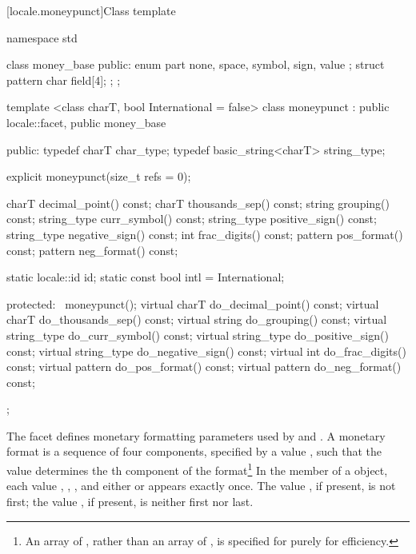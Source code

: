 [locale.moneypunct]{Class template }

%
\begin{codeblock}
namespace std {
  class money_base {
  public:
    enum part { none, space, symbol, sign, value };
    struct pattern { char field[4]; };
  };

  template <class charT, bool International = false>
  class moneypunct : public locale::facet, public money_base {
  public:
    typedef charT char_type;
    typedef basic_string<charT> string_type;

    explicit moneypunct(size_t refs = 0);

    charT        decimal_point() const;
    charT        thousands_sep() const;
    string       grouping()      const;
    string_type  curr_symbol()   const;
    string_type  positive_sign() const;
    string_type  negative_sign() const;
    int          frac_digits()   const;
    pattern      pos_format()    const;
    pattern      neg_format()    const;

    static locale::id id;
    static const bool intl = International;

  protected:
    ~moneypunct();
    virtual charT        do_decimal_point() const;
    virtual charT        do_thousands_sep() const;
    virtual string       do_grouping()      const;
    virtual string_type  do_curr_symbol()   const;
    virtual string_type  do_positive_sign() const;
    virtual string_type  do_negative_sign() const;
    virtual int          do_frac_digits()   const;
    virtual pattern      do_pos_format()    const;
    virtual pattern      do_neg_format()    const;
  };
}
\end{codeblock}

\pnum
The
facet defines monetary formatting parameters used by
and
.
A monetary format is a sequence of four components,
specified by a
value
,
such that the
value
determines the
th
component of the format\footnote{An array of
,
rather than an array of
,
is specified for
purely for efficiency.}
In the
member of a
object, each value
,
,
,
and either
or
appears exactly once.
The value
,
if present, is not first;
the value
,
if present, is neither first nor last.

